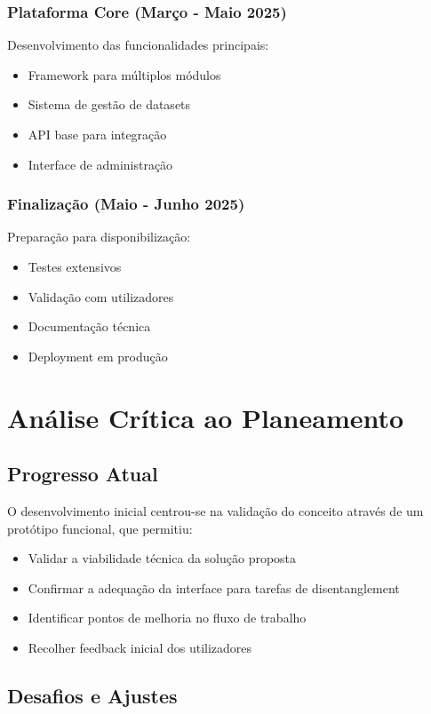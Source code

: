 \subsubsection{Plataforma Core (Março - Maio 2025)}
Desenvolvimento das funcionalidades principais:
\begin{itemize}
    \item Framework para múltiplos módulos
    \item Sistema de gestão de datasets
    \item API base para integração
    \item Interface de administração
\end{itemize}

\subsubsection{Finalização (Maio - Junho 2025)}
Preparação para disponibilização:
\begin{itemize}
    \item Testes extensivos
    \item Validação com utilizadores
    \item Documentação técnica
    \item Deployment em produção
\end{itemize}

\section{Análise Crítica ao Planeamento}

\subsection{Progresso Atual}

O desenvolvimento inicial centrou-se na validação do conceito através de um protótipo funcional, que permitiu:

\begin{itemize}
    \item Validar a viabilidade técnica da solução proposta
    \item Confirmar a adequação da interface para tarefas de disentanglement
    \item Identificar pontos de melhoria no fluxo de trabalho
    \item Recolher feedback inicial dos utilizadores
\end{itemize}

\subsection{Desafios e Ajustes}

